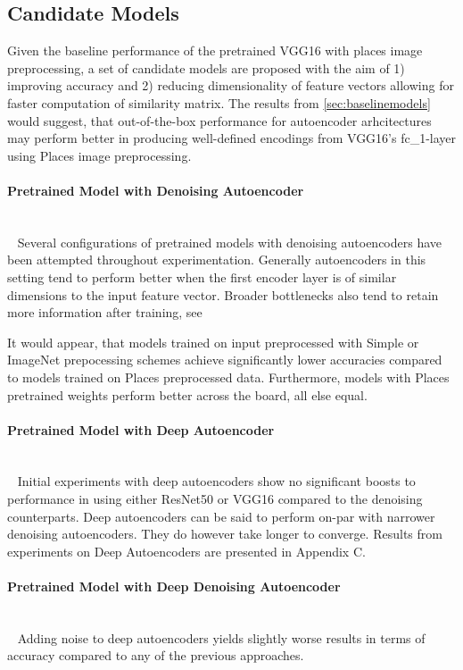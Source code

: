 \subsection{Candidate Models}
Given the baseline performance of the pretrained VGG16 with places image preprocessing, a set of candidate models are proposed with the aim of 1) improving accuracy and 2) reducing dimensionality of feature vectors allowing for faster computation of similarity matrix.
The results from \autoref{sec:baselinemodels} would suggest, that out-of-the-box performance for autoencoder arhcitectures may perform better in producing well-defined encodings from VGG16's fc\_1-layer using Places image preprocessing. 

\paragraph{Pretrained Model with Denoising Autoencoder} \\~
Several configurations of pretrained models with denoising autoencoders have been attempted throughout experimentation. 
Generally autoencoders in this setting tend to perform better when the first encoder layer is of similar dimensions to the input feature vector. 
Broader bottlenecks also tend to retain more information after training, see 

It would appear, that models trained on input preprocessed with Simple or ImageNet prepocessing schemes achieve significantly lower accuracies compared to models trained on Places preprocessed data. 
Furthermore, models with Places pretrained weights perform better across the board, all else equal. 


\paragraph{Pretrained Model with Deep Autoencoder} \\~
Initial experiments with deep autoencoders show no significant boosts to performance in using either ResNet50 or VGG16 compared to the denoising counterparts. 
Deep autoencoders can be said to perform on-par with narrower denoising autoencoders. They do however take longer to converge. 
Results from experiments on Deep Autoencoders are presented in Appendix C.

\paragraph{Pretrained Model with Deep Denoising Autoencoder} \\~
Adding noise to deep autoencoders yields slightly worse results in terms of accuracy compared to any of the previous approaches. 

